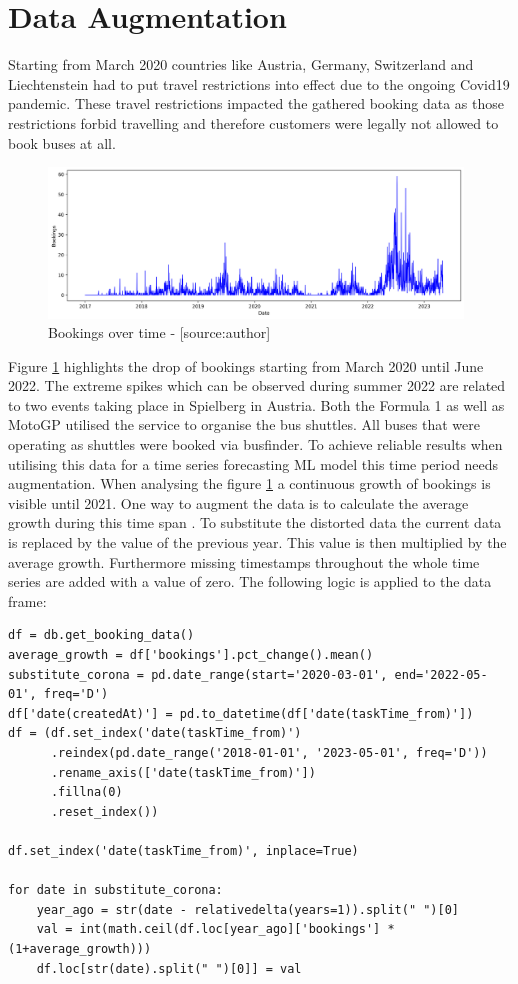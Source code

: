 \section{Data Augmentation}
\label{sec:data_aug}
Starting from March 2020 countries like Austria, Germany, Switzerland and Liechtenstein had to put travel restrictions into effect due to the ongoing Covid19 pandemic. These travel restrictions impacted the gathered booking data as those restrictions forbid travelling and therefore customers were legally not allowed to book buses at all.
\begin{figure}[H]
	\centering
		\includegraphics[width=11cm]{images/no_augmentation}
	\caption{Bookings over time - [source:author]}
	\label{fig:noAug}
\end{figure}
Figure \ref{fig:noAug} highlights the drop of bookings starting from March 2020 until June 2022. The extreme spikes which can be observed during summer 2022 are related to two events taking place in Spielberg in Austria. Both the Formula 1 as well as MotoGP utilised the service to organise the bus shuttles. All buses that were operating as shuttles were booked via busfinder.  To achieve reliable results when utilising this data for a time series forecasting ML model this time period needs augmentation. When analysing the figure \ref{fig:noAug} a continuous growth of bookings is visible until 2021. One way to augment the data is to calculate the average growth during this time span \cite{data_aug}. To substitute the distorted data the current data is replaced by the value of the previous year. This value is then multiplied by the average growth. Furthermore missing timestamps throughout the whole time series are added with a value of zero. The following logic is applied to the data frame: 

\begin{lstlisting}
df = db.get_booking_data()
average_growth = df['bookings'].pct_change().mean()
substitute_corona = pd.date_range(start='2020-03-01', end='2022-05-01', freq='D')
df['date(createdAt)'] = pd.to_datetime(df['date(taskTime_from)'])
df = (df.set_index('date(taskTime_from)')
      .reindex(pd.date_range('2018-01-01', '2023-05-01', freq='D'))
      .rename_axis(['date(taskTime_from)'])
      .fillna(0)
      .reset_index())

df.set_index('date(taskTime_from)', inplace=True)

for date in substitute_corona:
    year_ago = str(date - relativedelta(years=1)).split(" ")[0]
    val = int(math.ceil(df.loc[year_ago]['bookings'] * (1+average_growth)))
    df.loc[str(date).split(" ")[0]] = val
\end{lstlisting}

